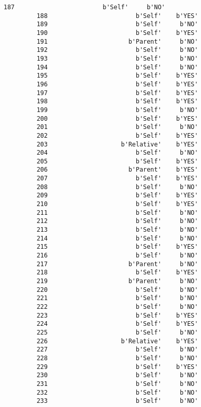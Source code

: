 \documentclass[11pt]{article}
\begin{document}
\begin{Verbatim}[commandchars=\\\{\}]
         187                        b'Self'     b'NO'  
         188                        b'Self'    b'YES'  
         189                        b'Self'     b'NO'  
         190                        b'Self'    b'YES'  
         191                      b'Parent'     b'NO'  
         192                        b'Self'     b'NO'  
         193                        b'Self'     b'NO'  
         194                        b'Self'     b'NO'  
         195                        b'Self'    b'YES'  
         196                        b'Self'    b'YES'  
         197                        b'Self'    b'YES'  
         198                        b'Self'    b'YES'  
         199                        b'Self'     b'NO'  
         200                        b'Self'    b'YES'  
         201                        b'Self'     b'NO'  
         202                        b'Self'    b'YES'  
         203                    b'Relative'    b'YES'  
         204                        b'Self'     b'NO'  
         205                        b'Self'    b'YES'  
         206                      b'Parent'    b'YES'  
         207                        b'Self'    b'YES'  
         208                        b'Self'     b'NO'  
         209                        b'Self'    b'YES'  
         210                        b'Self'    b'YES'  
         211                        b'Self'     b'NO'  
         212                        b'Self'     b'NO'  
         213                        b'Self'     b'NO'  
         214                        b'Self'     b'NO'  
         215                        b'Self'    b'YES'  
         216                        b'Self'     b'NO'  
         217                      b'Parent'     b'NO'  
         218                        b'Self'    b'YES'  
         219                      b'Parent'     b'NO'  
         220                        b'Self'     b'NO'  
         221                        b'Self'     b'NO'  
         222                        b'Self'     b'NO'  
         223                        b'Self'    b'YES'  
         224                        b'Self'    b'YES'  
         225                        b'Self'     b'NO'  
         226                    b'Relative'    b'YES'  
         227                        b'Self'     b'NO'  
         228                        b'Self'     b'NO'  
         229                        b'Self'    b'YES'  
         230                        b'Self'     b'NO'  
         231                        b'Self'     b'NO'  
         232                        b'Self'     b'NO'  
         233                        b'Self'     b'NO'  

\end{Verbatim}
\end{document}
